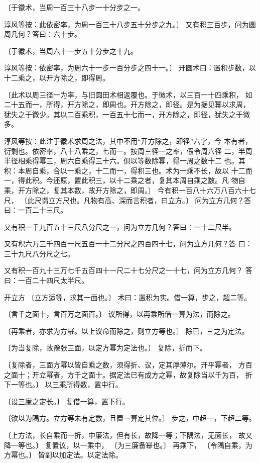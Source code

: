 \documentclass[12pt,UTF8]{ctexbook}
\begin{document}
〔于徽术，当周一百三十八步一十分步之一。

淳风等按：此依密率，为周一百三十八步五十分步之九。〕 又有积三百步，问为圆周几何？答曰：六十步。

〔于徽术，当周六十一步五十分步之十九。

淳风等按：依密率，为周六十一步一百分步之四十一。〕 开圆术曰：置积步数，以十二乘之，以开方除之，即得周。

〔此术以周三径一为率，与旧圆田术相返覆也。于徽术，以三百一十四乘积， 如二十五而一，所得，开方除之，即周也。开方除之，即径。是为据见幂以求周， 犹失之于微少。其以二百乘积，一百五十七而一，开方除之，即径，犹失之于微 多。

淳风等按：此注于徽术求周之法，其中不用“开方除之，即径”六字，今 本有者，衍剩也。依密率，八十八乘之，七而一。按周三径一之率，假令周六径 二，半周半径相乘得幂三，周六自乘得三十六。俱以等数除幂，得一周之数十二 也。其积：本周自乘，合以一乘之，十二而一，得积三也。术为一乘不长，故以 十二而一，得此积。今还原，置此积三，以十二乘之者，复其本周自乘之数。凡 物自乘，开方除之，复其本数，故开方除之，即周。〕 今有积一百八十六万八百六十七尺， 〔此尺谓立方尺也。凡物有高、深而言积者，曰立方。〕 问为立方几何？答曰：一百二十三尺。

又有积一千九百五十三尺八分尺之一，问为立方几何？答曰：一十二尺半。

又有积六万三千四百一尺五百一十二分尺之四百四十七，问为立方几何？答 曰：三十九尺八分尺之七。

又有积一百九十三万七千五百四十一尺二十七分尺之一十七，问为立方几何？ 答曰：一百二十四尺太半尺。

开立方 〔立方适等，求其一面也。〕 术曰：置积为实。借一算，步之，超二等。

〔言千之面十，言百万之面百。〕 议所得，以再乘所借一算为法，而除之。

〔再乘者，亦求为方幂。以上议命而除之，则立方等也。〕 除已，三之为定法。

〔为当复除，故豫张三面，以定方幂为定法也。〕 复除，折而下。

〔复除者，三面方幂以皆自乘之数，须得折、议，定其厚薄尔。开平幂者， 方百之面十；开立幂者，方千之面十。据定法已有成方之幂，故复除当以千为百， 折下一等也。〕 以三乘所得数，置中行。

〔设三廉之定长。〕 复借一算，置下行。

〔欲以为隅方。立方等未有定数，且置一算定其位。〕 步之，中超一，下超二等。

〔上方法，长自乘而一折，中廉法，但有长，故降一等；下隅法，无面长， 故又降一等也。〕 复置议，以一乘中， 〔为三廉备幂也。〕 再乘下， 〔令隅自乘，为方幂也。〕 皆副以加定法。以定法除。
\end{document}

